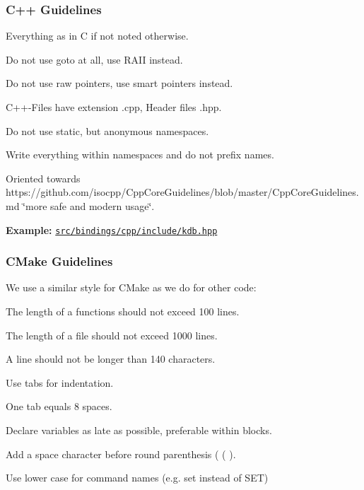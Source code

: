 \subsubsection*{C++ Guidelines}


\begin{DoxyItemize}
\item Everything as in C if not noted otherwise.
\item Do not use goto at all, use R\+A\+II instead.
\item Do not use raw pointers, use smart pointers instead.
\item C++-\/\+Files have extension {\ttfamily .cpp}, Header files {\ttfamily .hpp}.
\item Do not use {\ttfamily static}, but anonymous namespaces.
\item Write everything within namespaces and do not prefix names.
\item Oriented towards https\+://github.com/isocpp/\+Cpp\+Core\+Guidelines/blob/master/\+Cpp\+Core\+Guidelines.\+md \char`\"{}more safe and modern usage\char`\"{}.
\end{DoxyItemize}

{\bfseries Example\+:} \href{/home/markus/Projekte/Elektra/current/src/bindings/cpp/include/kdb.hpp}{\tt src/bindings/cpp/include/kdb.\+hpp}

\subsubsection*{C\+Make Guidelines}

We use a similar style for C\+Make as we do for other code\+:


\begin{DoxyItemize}
\item The length of a functions should not exceed 100 lines.
\item The length of a file should not exceed 1000 lines.
\item A line should not be longer than 140 characters.
\item Use tabs for indentation.
\item One tab equals 8 spaces.
\item Declare variables as late as possible, preferable within blocks.
\item Add a space character before round parenthesis ( {\ttfamily (} ).
\item Use lower case for command names (e.\+g. {\ttfamily set} instead of {\ttfamily S\+ET})
\end{DoxyItemize}

